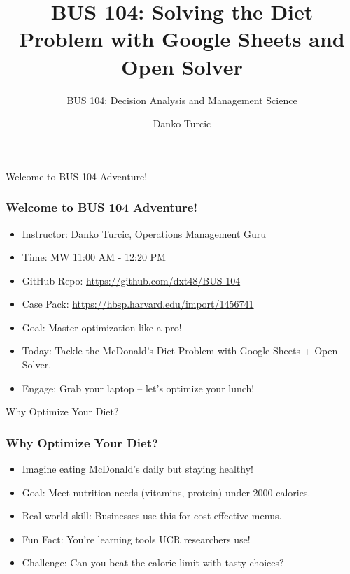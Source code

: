 \documentclass{beamer}
\title{BUS 104: Solving the Diet Problem with Google Sheets and Open Solver}
\subtitle{BUS 104: Decision Analysis and Management Science}
\author{Danko Turcic}
\begin{document}
\maketitle

\begin{frame}{Welcome to BUS 104 Adventure!}
\frametitle{Welcome to BUS 104 Adventure!}
\begin{itemize}
  \item Instructor: Danko Turcic, Operations Management Guru
  \item Time: MW 11:00 AM - 12:20 PM
  \item GitHub Repo: \url{https://github.com/dxt48/BUS-104}
  \item Case Pack: \url{https://hbsp.harvard.edu/import/1456741}
  \item Goal: Master optimization like a pro!
  \item Today: Tackle the McDonald's Diet Problem with Google Sheets + Open Solver.
  \item Engage: Grab your laptop – let’s optimize your lunch!
\end{itemize}
\end{frame}

\begin{frame}{Why Optimize Your Diet?}
\frametitle{Why Optimize Your Diet?}
\begin{itemize}
  \item Imagine eating McDonald's daily but staying healthy!
  \item Goal: Meet nutrition needs (vitamins, protein) under 2000 calories.
  \item Real-world skill: Businesses use this for cost-effective menus.
  \item Fun Fact: You’re learning tools UCR researchers use!
  \item Challenge: Can you beat the calorie limit with tasty choices?
\end{itemize}
\end{frame}
\end{document}
